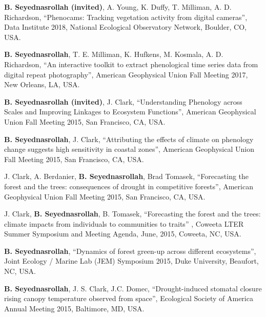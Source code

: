 \documentclass[10pt]{article}
\newenvironment{changemargin}[2]{%
  \begin{list}{}{%
 \setlength{\topsep}{0pt}%
 \setlength{\leftmargin}{#1}%
 \setlength{\rightmargin}{#2}%
 \setlength{\listparindent}{\parindent}%
 \setlength{\itemindent}{\parindent}%
 \setlength{\parsep}{\parskip}%
  }%
  \item[]}{\end{list}
}
\newenvironment{body} {
  \vspace*{-2pt}
  \begin{changemargin}{-0.5in}{-0.5in}
}
{\end{changemargin}
}
\begin{document}
\begin{body}
\begin{etaremune}
    \item \textbf{B. Seyednasrollah (invited)}, A. Young, K. Duffy, T. Milliman, A. D. Richardson, ``Phenocams: Tracking vegetation activity from digital cameras'', Data Institute 2018, National Ecological Observatory Network, Boulder, CO, USA.\\
    \medskip

    \item \textbf{B. Seyednasrollah}, T. E. Milliman, K. Hufkens, M. Kosmala, A. D. Richardson, ``An interactive toolkit to extract phenological time series data from digital repeat photography'', American Geophysical Union Fall Meeting 2017, New Orleans, LA, USA.\\
    \medskip

    \item \textbf{B. Seyednasrollah (invited)}, J. Clark, ``Understanding Phenology across Scales and Improving Linkages to Ecosystem Functions'', American Geophysical Union Fall Meeting 2015, San Francisco, CA, USA.\\
    \medskip

    \item \textbf{B. Seyednasrollah}, J. Clark, ``Attributing the effects of climate on phenology change suggests high sensitivity in coastal zones'', American Geophysical Union Fall Meeting 2015, San Francisco, CA, USA.\\
    \medskip

    \item J. Clark, A. Berdanier, \textbf{B. Seyednasrollah}, Brad Tomasek, ``Forecasting the forest and the trees: consequences of drought in competitive forests'', American Geophysical Union Fall Meeting 2015, San Francisco, CA, USA.\\
    \medskip

    \item J. Clark, \textbf {B. Seyednasrollah}, B.  Tomasek, ``Forecasting the forest and the trees: climate impacts from individuals to communities to traits'' , Coweeta LTER Summer Symposium and Meeting Agenda, June, 2015, Coweeta, NC, USA.\\
    \medskip

    \item \textbf{B. Seyednasrollah}, ``Dynamics of forest green-up across different ecosystems'', Joint Ecology / Marine Lab (JEM) Symposium 2015, Duke University, Beaufort, NC, USA.\\
    \medskip

    \item \textbf{B. Seyednasrollah}, J. S. Clark, J.C. Domec, ``Drought-induced stomatal closure rising canopy temperature observed from space'', Ecological Society of America Annual Meeting 2015, Baltimore, MD, USA.\\
    \medskip


\end{etaremune}
\end{body}
\end{document}
